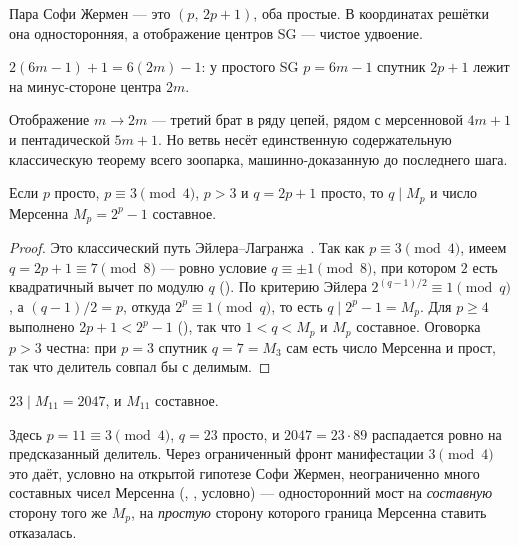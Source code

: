 Пара Софи Жермен --- это $(p,\,2p+1)$, оба простые. В координатах решётки она односторонняя, а
отображение центров SG --- чистое удвоение.

\begin{theorem}\label{thm:sg_center_doubling}
\green{}\; $2(6m-1)+1 = 6(2m)-1$: у простого SG $p=6m-1$ спутник $2p+1$ лежит на минус-стороне
центра $2m$.
\end{theorem}

Отображение $m\to 2m$ --- третий брат в ряду цепей, рядом с мерсенновой $4m+1$ и пентадической
$5m+1$. Но ветвь несёт единственную содержательную классическую теорему всего зоопарка,
машинно-доказанную до последнего шага.

\begin{theorem}\label{thm:sophieGermain_divides_mersenne}
\green{}\; Если $p$ просто, $p\equiv 3\pmod 4$, $p>3$ и $q=2p+1$ просто, то $q\mid M_p$ и число
Мерсенна $M_p=2^p-1$ составное.
\end{theorem}

\begin{proof}
Это классический путь Эйлера--Лагранжа~\cite{hardy-wright}. Так как $p\equiv3\pmod4$, имеем
$q=2p+1\equiv7\pmod8$ --- ровно условие $q\equiv\pm1\pmod8$, при котором $2$ есть квадратичный
вычет по модулю $q$ (). По критерию Эйлера
$2^{(q-1)/2}\equiv 1\pmod q$, а $(q-1)/2=p$, откуда $2^p\equiv 1\pmod q$, то есть $q\mid 2^p-1=M_p$.
Для $p\ge4$ выполнено $2p+1<2^p-1$ (), так что $1<q<M_p$ и
$M_p$ составное. Оговорка $p>3$ честна: при $p=3$ спутник $q=7=M_3$ сам есть число Мерсенна и прост,
так что делитель совпал бы с делимым.
\end{proof}

\begin{theorem}\label{thm:mersenne_composite_examples}
\green{}\; $23\mid M_{11}=2047$, и $M_{11}$ составное.
\end{theorem}

Здесь $p=11\equiv3\pmod4$, $q=23$ просто, и $2047=23\cdot89$ распадается ровно на предсказанный
делитель. Через ограниченный фронт манифестации $3\pmod4$ это даёт, условно на открытой гипотезе
Софи Жермен, неограниченно много составных чисел Мерсенна
(, \green{},
условно) --- односторонний мост на \emph{составную} сторону того же $M_p$, на \emph{простую} сторону
которого граница Мерсенна ставить отказалась.

